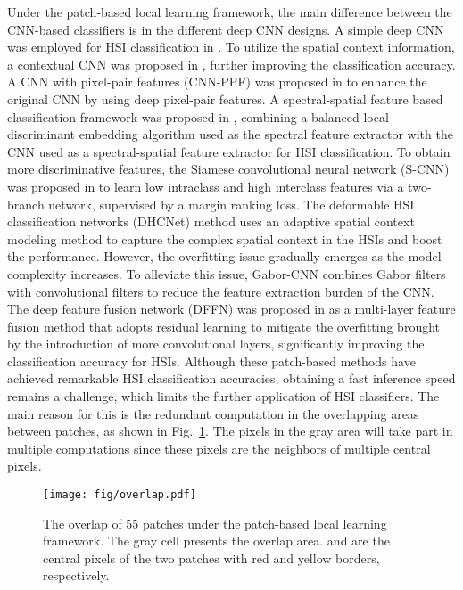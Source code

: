 \documentclass[journal]{IEEEtran}
\begin{document}
Under the patch-based local learning framework, the main difference between the CNN-based classifiers is in the different deep CNN designs.
A simple deep CNN was employed for HSI classification in \cite{hu2015deep}.
To utilize the spatial context information, a contextual CNN was proposed in \cite{lee2016contextual}, further improving the classification accuracy.
A CNN with pixel-pair features (CNN-PPF) was proposed in \cite{li2016hyperspectral} to enhance the original CNN by using deep pixel-pair features.
A spectral-spatial feature based classification framework was proposed in \cite{zhao2016spectral}, combining a balanced local discriminant embedding algorithm used as the spectral feature extractor with the CNN used as a spectral-spatial feature extractor for HSI classification.
To obtain more discriminative features, the Siamese convolutional neural network (S-CNN) was proposed in \cite{liu2017supervised} to learn low intraclass and high interclass features via a two-branch network, supervised by a margin ranking loss.
The deformable HSI classification networks (DHCNet) method \cite{zhu2018deformable} uses an adaptive spatial context modeling method to capture the complex spatial context in the HSIs and boost the performance.
However, the overfitting issue gradually emerges as the model complexity increases.
To alleviate this issue, Gabor-CNN \cite{chen2017hyperspectral} combines Gabor filters with convolutional filters to reduce the feature extraction burden of the CNN.
The deep feature fusion network (DFFN) was proposed in \cite{song2018hyperspectral} as a multi-layer feature fusion method that adopts residual learning to mitigate the overfitting brought by the introduction of more convolutional layers, significantly improving the classification accuracy for HSIs.
Although these patch-based methods have achieved remarkable HSI classification accuracies,
obtaining a fast inference speed remains a challenge, which limits the further application of HSI classifiers.
The main reason for this is the redundant computation in the overlapping areas between patches, as shown in Fig.~\ref{fig:overlap}.
The pixels in the gray area will take part in multiple computations since these pixels are the neighbors of multiple central pixels.

\begin{figure}
  \centering
  \texttt{[image: fig/overlap.pdf]}
  \caption{The overlap of 55 patches under the patch-based local learning framework. The gray cell presents the overlap area.  and  are the central pixels of the two patches with red and yellow borders, respectively.}
  \label{fig:overlap}
\end{figure}
\end{document}
